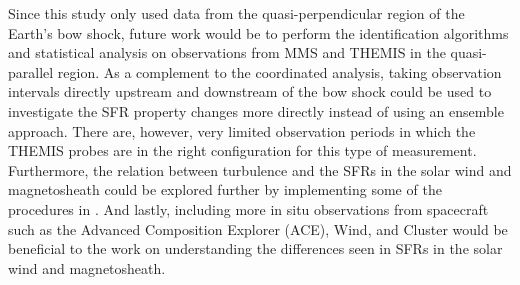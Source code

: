 Since this study only used data from the quasi-perpendicular region of the Earth's bow shock, future work would be to perform the identification algorithms and statistical analysis on observations from MMS and THEMIS in the quasi-parallel region. As a complement to the coordinated analysis, taking observation intervals directly upstream and downstream of the bow shock could be used to investigate the SFR property changes more directly instead of using an ensemble approach. There are, however, very limited observation periods in which the THEMIS probes are in the right configuration for this type of measurement. Furthermore, the relation between turbulence and the SFRs in the solar wind and magnetosheath could be explored further by implementing some of the procedures in \cite{Zank2:2021, Adhikari:2022, Zhao:2022}. And lastly, including more in situ observations from spacecraft such as the Advanced Composition Explorer (ACE), Wind, and Cluster would be beneficial to the work on understanding the differences seen in SFRs in the solar wind and magnetosheath.